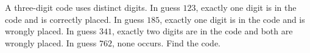 A three-digit code uses distinct digits. In guess $123$, exactly one digit is in the code and is correctly placed. In guess $185$, exactly one digit is in the code and is wrongly placed. In guess $341$, exactly two digits are in the code and both are wrongly placed. In guess $762$, none occurs. Find the code.

